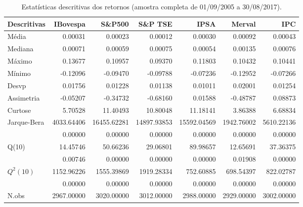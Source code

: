 \begin{table}[H]
\centering
\caption{Estatísticas descritivas dos retornos (amostra completa de 01/09/2005 a 30/08/2017).} 
\label{tab:descritivas}
\begin{tabular}{lrrrrrr}
  \hline
Descritivas & IBovespa & S\&P500 & S\&P TSE & IPSA & Merval & IPC \\ 
  \hline
Média & 0.00031 & 0.00023 & 0.00012 & 0.00030 & 0.00092 & 0.00043 \\ 
  Mediana & 0.00071 & 0.00059 & 0.00075 & 0.00054 & 0.00135 & 0.00076 \\ 
  Máximo & 0.13677 & 0.10957 & 0.09370 & 0.11803 & 0.10432 & 0.10441 \\ 
  Mínimo & -0.12096 & -0.09470 & -0.09788 & -0.07236 & -0.12952 & -0.07266 \\ 
  Desvp & 0.01756 & 0.01228 & 0.01138 & 0.01011 & 0.02001 & 0.01254 \\ 
  Assimetria & -0.05207 & -0.34732 & -0.68160 & 0.01588 & -0.48787 & 0.08873 \\ 
  Curtose & 5.70528 & 11.40493 & 10.80048 & 11.18141 & 3.86388 & 6.68834 \\ 
  Jarque-Bera & 4033.64406 & 16455.62281 & 14897.93853 & 15592.04569 & 1942.76002 & 5610.22136 \\ 
   & 0.00000 & 0.00000 & 0.00000 & 0.00000 & 0.00000 & 0.00000 \\ 
  Q(10) & 14.45746 & 50.66236 & 29.06801 & 89.98657 & 12.65691 & 37.36375 \\ 
   & 0.00746 & 0.00000 & 0.00000 & 0.00000 & 0.01908 & 0.00000 \\ 
  $Q^2(10)$ & 1152.96226 & 1555.39869 & 1919.28334 & 752.60885 & 698.54397 & 822.02787 \\ 
   & 0.00000 & 0.00000 & 0.00000 & 0.00000 & 0.00000 & 0.00000 \\ 
  N.obs & 2967.00000 & 3020.00000 & 3012.00000 & 2988.00000 & 2929.00000 & 3002.00000 \\ 
   \hline
\end{tabular}
\end{table}
